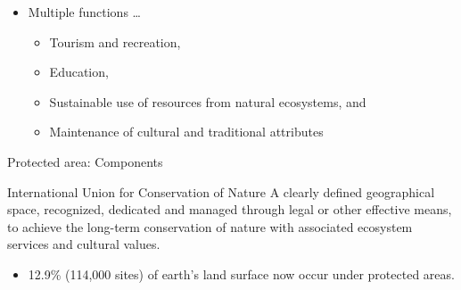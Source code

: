 \documentclass[ignorenonframetext,aspectratio=169]{beamer}
\providecommand{\tightlist}{%
  \setlength{\itemsep}{0pt}\setlength{\parskip}{0pt}}
\begin{document}
\begin{frame}{}
\protect\hypertarget{section}{}

\begin{itemize}
\tightlist
\item
  Multiple functions \ldots{}

  \begin{itemize}
  \tightlist
  \item
    Tourism and recreation,
  \item
    Education,
  \item
    Sustainable use of resources from natural ecosystems, and
  \item
    Maintenance of cultural and traditional attributes
  \end{itemize}
\end{itemize}

\end{frame}

\begin{frame}{Protected area: Components}
\protect\hypertarget{protected-area-components}{}

\begin{block}{International Union for Conservation of Nature}
A clearly defined geographical space, recognized, dedicated and managed through legal or other effective means, to achieve the long-term conservation of nature with associated ecosystem services and cultural values.
\end{block}

\begin{itemize}
\tightlist
\item
  12.9\% (114,000 sites) of earth's land surface now occur under
  protected areas.
\end{itemize}

\end{frame}
\end{document}
